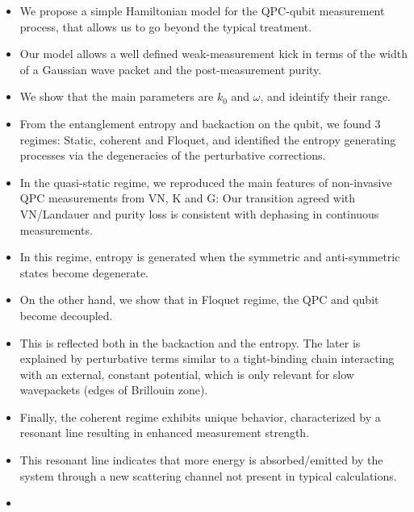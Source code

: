 \documentclass[10pt,
 amsmath,amssymb,
 aps,prb, twocolumn
]{revtex4-2}
\begin{document}
\begin{itemize}
    \item We propose a simple Hamiltonian model for the QPC-qubit measurement process, that allows us to go beyond the typical treatment.

    \item Our model allows a well defined weak-measurement kick in terms of the width of a Gaussian wave packet and the post-measurement purity. 
    
    \item We show that the main parameters are $k_0$ and $\omega$, and ideintify their range.

    \item From the entanglement entropy and backaction on the qubit, we found 3 regimes: Static, coherent and Floquet, and identified the entropy generating processes via the degeneracies of the perturbative corrections.
        
    \item In the quasi-static regime, we reproduced the main features of non-invasive QPC measurements from VN, K and G: Our transition agreed with VN/Landauer and purity loss is consistent with dephasing in continuous measurements. 

    \item In this regime, entropy is generated when the symmetric and anti-symmetric states become degenerate.

    \item On the other hand, we show that in Floquet regime, the QPC and qubit become decoupled.

    \item This is reflected both in the backaction and the entropy. The later is explained by perturbative terms similar to a tight-binding chain interacting with an external, constant potential, which is only relevant for slow wavepackets (edges of Brillouin zone).
    
    \item Finally, the coherent regime exhibits unique behavior, characterized by a resonant line resulting in enhanced measurement strength.

    \item This resonant line indicates that more energy is absorbed/emitted by the system through a new scattering channel not present in typical calculations.

    \item {}
    

\end{itemize}
\end{document}
